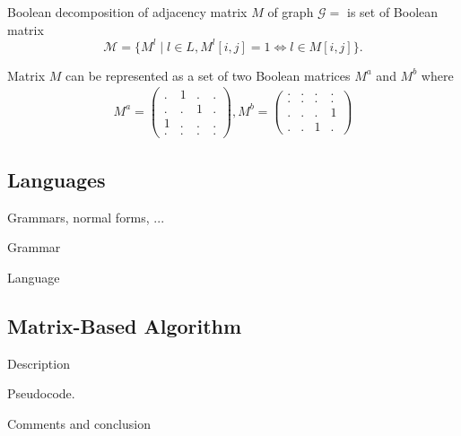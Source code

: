 \begin{definition}

Boolean decomposition of adjacency matrix $M$ of graph $\mathcal{G}=$ is set of Boolean matrix $$\mathcal{M} = \{M^l \mid l \in L, M^l[i,j]=1 \iff l \in M[i,j]\}.$$

\end{definition}

Matrix $M$ can be represented as a set of two Boolean matrices $M^a$ and $M^b$ where
\begin{align}
M^{a} =
\begin{pmatrix}
    . & 1 & . & .   \\
    . & . & 1 & .   \\
    1 & . & . & .   \\
    . & . & . & .  
\end{pmatrix}, 
M^{b} =
\begin{pmatrix}      
    . & . & . & .   \\
    . & . & . & .   \\
    . & . & . & 1   \\
    . & . & 1 & . 
\end{pmatrix} \label{eq:boolean_decomposition_of_graph}
\end{align}

\subsection{Languages}

Grammars, normal forms, ...
\begin{definition}
Grammar
\end{definition}

\begin{definition}
Language
\end{definition}


\subsection{Matrix-Based Algorithm}

Description

Pseudocode.

Comments and conclusion